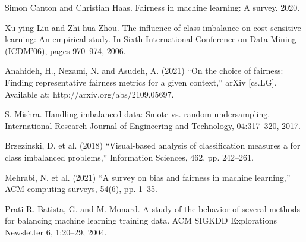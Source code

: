 \documentclass[sn-vancouver]{sn-jnl}%
\theoremstyle{thmstyleone}%
\theoremstyle{thmstyletwo}%
\theoremstyle{thmstylethree}%
\begin{document}
\begin{thebibliography}{9}

 Simon Canton and Christian Haas. Fairness in machine learning: A survey. 2020.

 Xu-ying Liu and Zhi-hua Zhou. The influence of class imbalance on cost-sensitive learning: An empirical study. In Sixth International Conference on Data Mining (ICDM’06), pages 970–974, 2006.

 Anahideh, H., Nezami, N. and Asudeh, A. (2021) “On the choice of fairness: Finding representative fairness metrics for a given context,” arXiv [cs.LG]. Available at: http://arxiv.org/abs/2109.05697.

 S. Mishra. Handling imbalanced data: Smote vs. random undersampling. International Research Journal of Engineering and Technology, 04:317–320, 2017.

 Brzezinski, D. et al. (2018) “Visual-based analysis of classification measures a for class imbalanced problems,” Information Sciences, 462, pp. 242–261.

 Mehrabi, N. et al. (2021) “A survey on bias and fairness in machine learning,” ACM computing surveys, 54(6), pp. 1–35.

 Prati R. Batista, G. and M. Monard. A study of the behavior of several methods for balancing machine learning training data. ACM SIGKDD Explorations Newsletter 6, 1:20–29, 2004.

\end{thebibliography}


\end{document}
